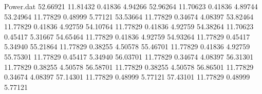\begin{filecontents}{Power.dat}
  52.66921   11.81432    0.41836    4.94266
  52.96264   11.70623    0.41836    4.89744
  53.24964   11.77829    0.48999    5.77121
  53.53664   11.77829    0.34674    4.08397
  53.82464   11.77829    0.41836    4.92759
  54.10764   11.77829    0.41836    4.92759
  54.38264   11.70623    0.45417    5.31667
  54.65464   11.77829    0.41836    4.92759
  54.93264   11.77829    0.45417    5.34940
  55.21864   11.77829    0.38255    4.50578
  55.46701   11.77829    0.41836    4.92759
  55.75301   11.77829    0.45417    5.34940
  56.03701   11.77829    0.34674    4.08397
  56.31301   11.77829    0.38255    4.50578
  56.58701   11.77829    0.38255    4.50578
  56.86501   11.77829    0.34674    4.08397
  57.14301   11.77829    0.48999    5.77121
  57.43101   11.77829    0.48999    5.77121
\end{filecontents}
